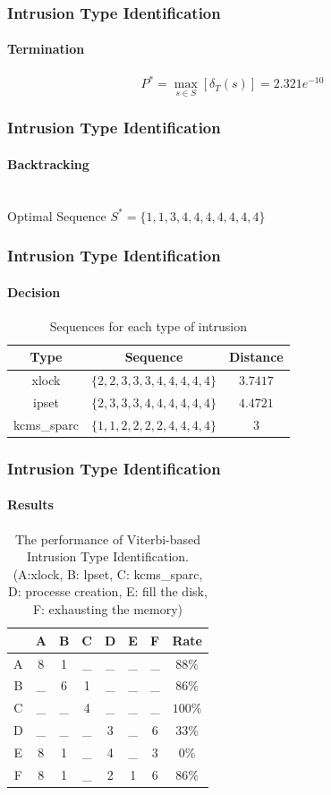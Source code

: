 \documentclass{beamer}
\begin{document}
\begin{frame}
  \frametitle{Intrusion Type Identification}
  \framesubtitle{Termination}
  $$
  P^{*} = \max\limits_{s \in S}[\delta_T(s)] = 2.321e^{-10}
  $$
\end{frame}
\begin{frame}
  \frametitle{Intrusion Type Identification}
  \framesubtitle{Backtracking}
  \\
  Optimal Sequence $ S^{*} = \{1,1,3,4,4,4,4,4,4,4\}$
\end{frame}
\begin{frame}
  \frametitle{Intrusion Type Identification}
  \framesubtitle{Decision}
  \begin{table}
    \caption{\label{tab:type}Sequences for each type of intrusion}
    \begin{tabular}{|c|c|c|}
      \hline
      Type & Sequence & Distance \\ \hline
      xlock & $\{2,2,3,3,3,4,4,4,4,4\}$ & $3.7417$ \\ \hline
      ipset & $\{2,3,3,3,4,4,4,4,4,4\}$ & $4.4721$ \\ \hline
      kcms\_sparc & $\{1,1,2,2,2,2,4,4,4,4\}$ & $3$ \\ \hline
    \end{tabular}
  \end{table}
\end{frame}
\begin{frame}
  \frametitle{Intrusion Type Identification}
  \framesubtitle{Results}
  \begin{table}[h]
    \centering
    \caption{\label{tab:IDS}The performance of Viterbi-based Intrusion
      Type Identification. (A:xlock, B: lpset, C:
kcms\_sparc, D: processe creation, E: fill the disk, F: exhausting the memory)}
    \begin{tabular}{|c| c|c | c | c | c | c | c |}
      \hline & A & B &C &D &E &F &Rate \\ \hline
      A & 8 & 1 & \_ & \_ & \_ & \_ & $88\%$ \\ \hline
      B & \_ & 6 & 1  & \_ & \_ & \_& $86\%$ \\ \hline
      C & \_ & \_ & 4 & \_ & \_ & \_ & $100\%$ \\ \hline
      D & \_ & \_ & \_ & 3 & \_ & 6 &$33\%$ \\ \hline \hline
      E & 8 & 1 & \_ & 4 & \_ & 3 &$0\%$ \\ \hline
      F & 8 & 1 & \_ & 2 & 1 & 6 &$86\%$ \\ \hline
    \end{tabular}
  \end{table}    
\end{frame}
\end{document}
